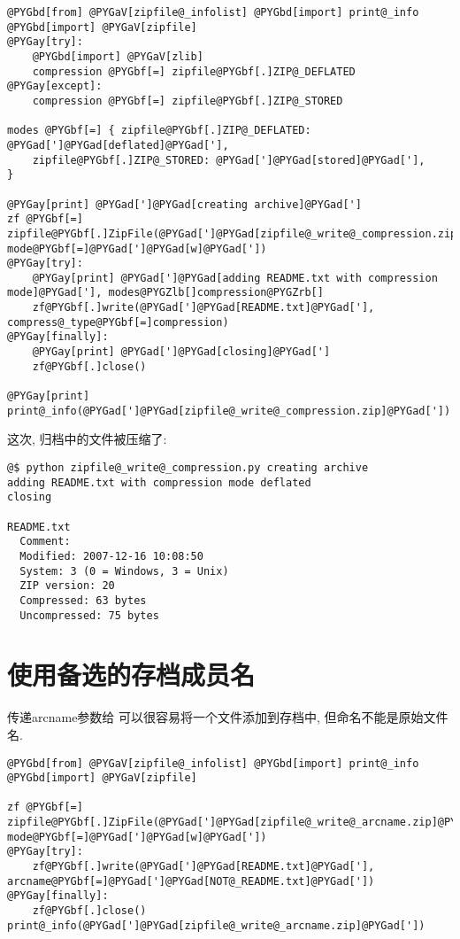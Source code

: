 \documentclass[a4paper,10pt,english]{manual}
\begin{document}
\begin{Verbatim}[commandchars=@\[\]]
@PYGbd[from] @PYGaV[zipfile@_infolist] @PYGbd[import] print@_info
@PYGbd[import] @PYGaV[zipfile]
@PYGay[try]:
    @PYGbd[import] @PYGaV[zlib]
    compression @PYGbf[=] zipfile@PYGbf[.]ZIP@_DEFLATED
@PYGay[except]:
    compression @PYGbf[=] zipfile@PYGbf[.]ZIP@_STORED

modes @PYGbf[=] { zipfile@PYGbf[.]ZIP@_DEFLATED: @PYGad[']@PYGad[deflated]@PYGad['],
    zipfile@PYGbf[.]ZIP@_STORED: @PYGad[']@PYGad[stored]@PYGad['],
}

@PYGay[print] @PYGad[']@PYGad[creating archive]@PYGad[']
zf @PYGbf[=] zipfile@PYGbf[.]ZipFile(@PYGad[']@PYGad[zipfile@_write@_compression.zip]@PYGad['], mode@PYGbf[=]@PYGad[']@PYGad[w]@PYGad['])
@PYGay[try]:
    @PYGay[print] @PYGad[']@PYGad[adding README.txt with compression mode]@PYGad['], modes@PYGZlb[]compression@PYGZrb[]
    zf@PYGbf[.]write(@PYGad[']@PYGad[README.txt]@PYGad['], compress@_type@PYGbf[=]compression)
@PYGay[finally]:
    @PYGay[print] @PYGad[']@PYGad[closing]@PYGad[']
    zf@PYGbf[.]close()

@PYGay[print]
print@_info(@PYGad[']@PYGad[zipfile@_write@_compression.zip]@PYGad['])
\end{Verbatim}

这次, 归档中的文件被压缩了:

\begin{Verbatim}[commandchars=@\[\]]
@$ python zipfile@_write@_compression.py creating archive
adding README.txt with compression mode deflated
closing

README.txt
  Comment:
  Modified: 2007-12-16 10:08:50
  System: 3 (0 = Windows, 3 = Unix)
  ZIP version: 20
  Compressed: 63 bytes
  Uncompressed: 75 bytes
\end{Verbatim}


\section{使用备选的存档成员名}

传递arcname参数给  可以很容易将一个文件添加到存档中, 但命名不能是原始文件名.

\begin{Verbatim}[commandchars=@\[\]]
@PYGbd[from] @PYGaV[zipfile@_infolist] @PYGbd[import] print@_info
@PYGbd[import] @PYGaV[zipfile]

zf @PYGbf[=] zipfile@PYGbf[.]ZipFile(@PYGad[']@PYGad[zipfile@_write@_arcname.zip]@PYGad['], mode@PYGbf[=]@PYGad[']@PYGad[w]@PYGad['])
@PYGay[try]:
    zf@PYGbf[.]write(@PYGad[']@PYGad[README.txt]@PYGad['], arcname@PYGbf[=]@PYGad[']@PYGad[NOT@_README.txt]@PYGad['])
@PYGay[finally]:
    zf@PYGbf[.]close()
print@_info(@PYGad[']@PYGad[zipfile@_write@_arcname.zip]@PYGad['])
\end{Verbatim}
\end{document}
